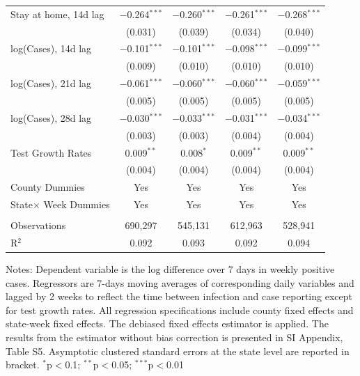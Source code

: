\documentclass[9pt,twocolumn,twoside,lineno]{pnas-new}
\begin{document}
\begin{table}[!htbp]
{\begin{tabular}{@{\extracolsep{1pt}}lcc|cc}
Stay at home, 14d  lag & $-$0.264$^{***}$ & $-$0.260$^{***}$ & $-$0.261$^{***}$ & $-$0.268$^{***}$ \\
  & (0.031) & (0.039) & (0.034) & (0.040) \\\hline
 log(Cases), 14d  lag  & $-$0.101$^{***}$ & $-$0.101$^{***}$ & $-$0.098$^{***}$ & $-$0.099$^{***}$ \\
  & (0.009) & (0.010) & (0.010) & (0.010) \\
 log(Cases), 21d  lag & $-$0.061$^{***}$ & $-$0.060$^{***}$ & $-$0.060$^{***}$ & $-$0.059$^{***}$ \\
  & (0.005) & (0.005) & (0.005) & (0.005) \\
 log(Cases), 28d  lag  & $-$0.030$^{***}$ & $-$0.033$^{***}$ & $-$0.031$^{***}$ & $-$0.034$^{***}$ \\
  & (0.003) & (0.003) & (0.004) & (0.004) \\
  Test Growth Rates & 0.009$^{**}$ & 0.008$^{*}$ & 0.009$^{**}$ & 0.009$^{**}$ \\
  & (0.004) & (0.004) & (0.004) & (0.004)\\
 \hline %
County Dummies & Yes & Yes &  Yes  &  Yes  \\
State$\times$ Week Dummies&Yes & Yes &  Yes  &  Yes  \\
\hline \\[-1.8ex] Observations & 690,297 & 545,131 & 612,963 & 528,941 \\
R$^{2}$ & 0.092 & 0.093 & 0.092 & 0.094 \\ \hline
\hline %
\end{tabular}}
\vspace{-0.2cm}  {\scriptsize
\begin{flushleft}
Notes: Dependent variable is the log difference over 7 days in weekly positive cases. Regressors are 7-days moving averages of corresponding daily variables  and lagged by 2 weeks to reflect the time between infection and case reporting except for test growth rates. All regression specifications include county fixed effects and state-week fixed effects.
The debiased fixed effects estimator is applied.  The results from the estimator without bias correction is presented in  SI Appendix, Table S5.
Asymptotic clustered standard errors at the state level are reported in bracket.   {$^{*}$p$<$0.1; $^{**}$p$<$0.05; $^{***}$p$<$0.01}
\end{flushleft}}
\end{table}
\end{document}
